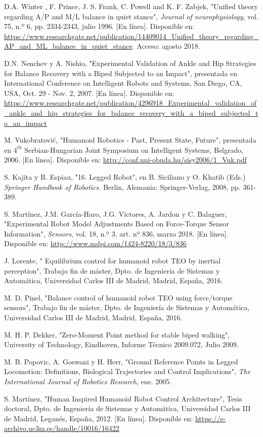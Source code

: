 \begin{thebibliography}{99}
 D.A. Winter , F. Prince, J. S. Frank, C. Powell and K. F. Zabjek, "Unified theory regarding A/P and M/L balance in quiet stance", \textit{Journal of neurophysiology}, vol. 75, n.º 6, pp. 2334-2343, julio 1996. [En línea]. Disponible en: \url{https://www.researchgate.net/publication/14409014_Unified_theory_regarding_AP_and_ML_balance_in_quiet_stance}. Acceso: agosto 2018.

 D.N. Nenchev y A. Nishio, "Experimental Validation of Ankle and Hip Strategies for Balance Recovery with a Biped Subjected to an Impact", presentada en International Conference on Intelligent Robots and Systems, San Diego, CA, USA, Oct. 29 - Nov. 2, 2007. [En línea]. Disponible en: \url{https://www.researchgate.net/publication/4296918_Experimental_validation_of_ankle_and_hip_strategies_for_balance_recovery_with_a_biped_subjected_to_an_impact}

 M. Vukobratović, "Humanoid Robotics - Past, Present State, Future", presentada en $4^{th}$ Serbian-Hungarian Joint Symposium on Intelligent Systems, Belgrado, 2006. [En línea]. Disponible en: \url{http://conf.uni-obuda.hu/sisy2006/1_Vuk.pdf}

 S. Kajita y B. Espiau, "16. Legged Robot", en B. Siciliano y O. Khatib (Eds.) \textit{Springer Handbook of Robotics}. Berlin, Alemania: Springer-Verlag, 2008, pp. 361-389.  

 S. Martínez, J.M. García-Haro, J.G. Victores, A. Jardon y C. Balaguer, "Experimental Robot Model Adjustments Based on Force-Torque Sensor Information", \textit{Sensors}, vol. 18, n.º 3, art. nº 836, marzo 2018. [En línea]. Disponible en: \url{http://www.mdpi.com/1424-8220/18/3/836} 

 J. Lorente, " Equilibrium control for humanoid robot TEO by inertial perception", Trabajo fin de máster, Dpto. de Ingeniería de Sistemas y Automática, Universidad Carlos III de Madrid, Madrid, España, 2016.

 M. D. Pinel, "Balance control of humanoid robot TEO using force/torque sensors", Trabajo fin de máster, Dpto. de Ingeniería de Sistemas y Automática, Universidad Carlos III de Madrid, Madrid, España, 2016.

 M. H. P. Dekker, "Zero-Moment Point method for stable biped walking", University of Technology, Eindhoven, Informe Técnico 2009.072, Julio 2009.

 M. B. Popovic, A. Goswani y H. Herr, "Ground Reference Points in Legged Locomotion: Definitions, Biological Trajectories and Control Implications", \textit{The International Journal of Robotics Research}, ene. 2005. 

 S. Martínez, "Human Inspired Humanoid Robot
Control Architecture", Tesis doctoral, Dpto. de Ingeniería de Sistemas y Automática, Universidad Carlos III de Madrid, Leganés, España, 2012. [En línea]. Disponible en: \url{https://e-archivo.uc3m.es/handle/10016/16422}


\end{thebibliography} 